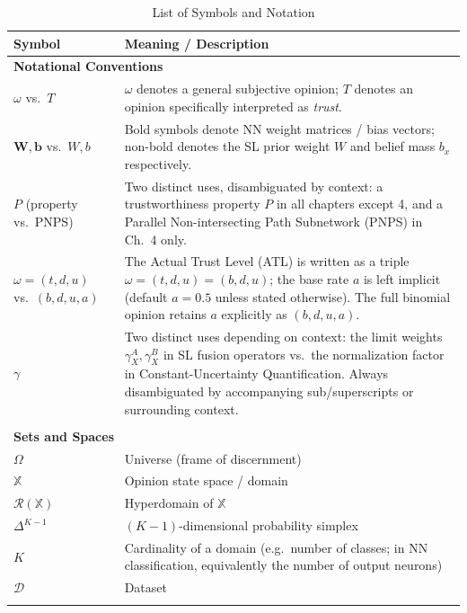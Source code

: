 

\begin{longtable}{lp{9cm}}

\caption{List of Symbols and Notation}
\label{tab:symbols} \\

\hline
\textbf{Symbol} & \textbf{Meaning / Description} \\
\hline
\multicolumn{2}{l}{\textbf{Notational Conventions}} \\
$\omega$ vs.\ $T$ & $\omega$ denotes a general subjective opinion; $T$ denotes an opinion specifically interpreted as \emph{trust}. \\
$\mathbf{W}, \mathbf{b}$ vs.\ $W, b$ & Bold symbols denote \acs{NN} weight matrices / bias vectors; non-bold denotes the \acs{SL} prior weight $W$ and belief mass $b_x$ respectively. \\
$P$ (property vs.\ PNPS) & Two distinct uses, disambiguated by context: a trustworthiness property $P$ in all chapters except 4, and a Parallel Non-intersecting Path Subnetwork (PNPS) in Ch.~4 only. \\
$\omega = (t,d,u)$ vs.\ $(b,d,u,a)$ & The Actual Trust Level (ATL) is written as a triple $\omega=(t,d,u)=(b,d,u)$; the base rate $a$ is left implicit (default $a=0.5$ unless stated otherwise). The full binomial opinion retains $a$ explicitly as $(b,d,u,a)$. \\
$\gamma$ & Two distinct uses depending on context: the limit weights $\gamma_X^A, \gamma_X^B$ in \acs{SL} fusion operators vs.\ the normalization factor in Constant-Uncertainty Quantification. Always disambiguated by accompanying sub/superscripts or surrounding context. \\[4pt]
\hline
\\
\hline
\multicolumn{2}{l}{\textbf{Sets and Spaces}} \\
$\Omega$ & Universe (frame of discernment) \\
$\mathbb{X}$ & Opinion state space / domain \\
$\mathcal{R}(\mathbb{X})$ & Hyperdomain of $\mathbb{X}$ \\
$\Delta^{K-1}$ & $(K{-}1)$-dimensional probability simplex \\
$K$ & Cardinality of a domain (e.g.\ number of classes; in \acs{NN} classification, equivalently the number of output neurons) \\
$\mathcal{D}$ & Dataset \\[4pt]
\hline
\\

\end{longtable}
